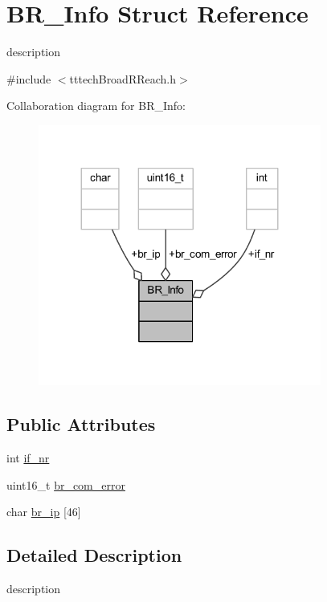 \hypertarget{struct_b_r___info}{}\section{B\+R\+\_\+\+Info Struct Reference}
\label{struct_b_r___info}


description  




{\ttfamily \#include $<$tttech\+Broad\+R\+Reach.\+h$>$}



Collaboration diagram for B\+R\+\_\+\+Info\+:
\nopagebreak
\begin{figure}[H]
\begin{center}
\leavevmode
\includegraphics[width=263pt]{struct_b_r___info__coll__graph}
\end{center}
\end{figure}
\subsection*{Public Attributes}
\begin{DoxyCompactItemize}
\item 
int \mbox{\hyperlink{struct_b_r___info_ad3139482d149e41ec15ac355cf4d5251}{if\+\_\+nr}}
\item 
uint16\+\_\+t \mbox{\hyperlink{struct_b_r___info_ac3670b53bfa902bb4295495b61fb6985}{br\+\_\+com\+\_\+error}}
\item 
char \mbox{\hyperlink{struct_b_r___info_a8923532471f4ec953142656d0414765f}{br\+\_\+ip}} \mbox{[}46\mbox{]}
\end{DoxyCompactItemize}


\subsection{Detailed Description}
description 

